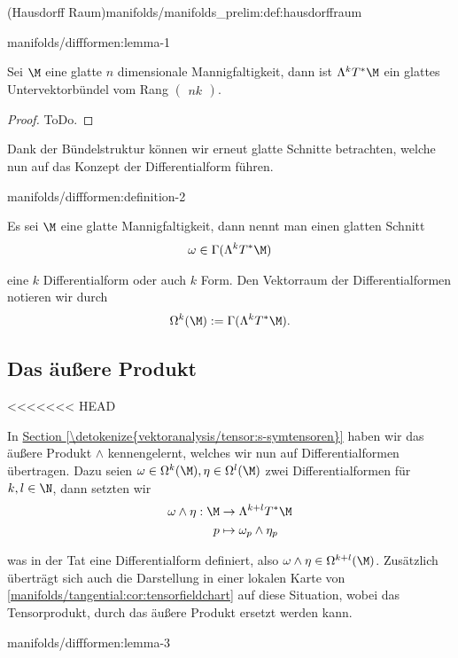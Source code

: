 \documentclass[letterpaper,10pt,english]{jupyterBook}
\begin{document}
\begin{definition}{(Hausdorff Raum)}{manifolds/manifolds_prelim:def:hausdorffraum}
\begin{lemma}{}{manifolds/diffformen:lemma-1}
\par
Sei \(\M\) eine glatte \(n\) dimensionale Mannigfaltigkeit, dann ist \(\Lambda^k T^\ast\M\) ein glattes Untervektorbündel vom Rang \(\begin{pmatrix} n k \end{pmatrix}\).
\end{lemma}

\begin{proof}
 ToDo.
\end{proof}

\par
Dank der Bündelstruktur können wir erneut glatte Schnitte betrachten, welche nun auf das Konzept der Differentialform führen.
\begin{definition}{}{manifolds/diffformen:definition-2}



\par
Es sei \(\M\) eine glatte Mannigfaltigkeit, dann nennt man einen glatten Schnitt
\begin{align*}
\omega\in \Gamma(\Lambda^k T^\ast\M)
\end{align*}
\par
eine \(k\) Differentialform oder auch \(k\) Form. Den Vektorraum der Differentialformen notieren wir durch
\begin{align*}
\Omega^k(\M) := \Gamma(\Lambda^k T^\ast\M).
\end{align*}\end{definition}


\subsection{Das äußere Produkt}
\label{\detokenize{manifolds/diffformen:das-auszere-produkt}}
<<<<<<< HEAD
\par
In \hyperref[\detokenize{vektoranalysis/tensor:s-symtensoren}]{Section \ref{\detokenize{vektoranalysis/tensor:s-symtensoren}}} haben wir das äußere Produkt \(\wedge\) kennengelernt, welches wir nun auf Differentialformen übertragen. Dazu seien \(\omega\in \Omega^k(\M), \eta\in \Omega^l(\M)\) zwei Differentialformen für \(k,l\in\N\), dann setzten wir
\begin{align*}
\omega \wedge \eta:\M &\to \Lambda^{k+l}T^\ast\M\\
p&\mapsto \omega_p \wedge \eta_p
\end{align*}
\par
was in der Tat eine Differentialform definiert, also \(\omega\wedge\eta \in \Omega^{k+l}(\M)\). Zusätzlich überträgt sich auch die Darstellung in einer lokalen Karte von \cref{manifolds/tangential:cor:tensorfieldchart} auf diese Situation, wobei das Tensorprodukt, durch das äußere Produkt ersetzt werden kann.
\begin{lemma}{}{manifolds/diffformen:lemma-3}




\end{lemma}
\end{definition}
\end{document}
